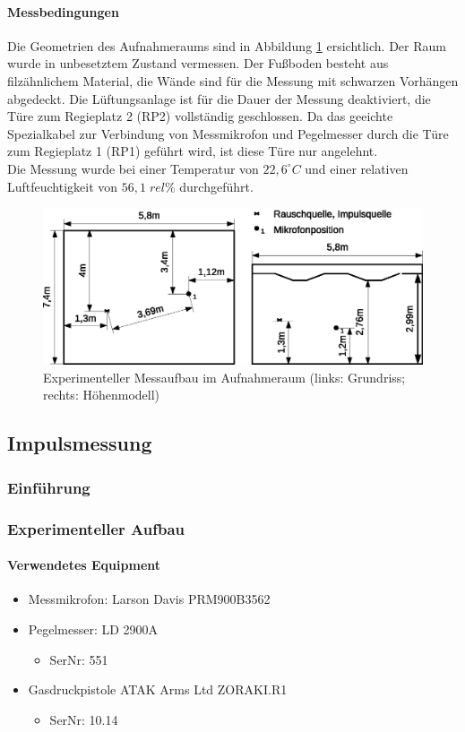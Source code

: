\documentclass[11pt]{report}
\begin{document}
\paragraph{Messbedingungen}
Die Geometrien des Aufnahmeraums sind in Abbildung \ref{fig:ARgeometrics} ersichtlich. Der Raum wurde in unbesetztem Zustand vermessen. Der Fu\ss boden besteht aus filz\"ahnlichem Material, die W\"ande sind f\"ur die Messung mit schwarzen Vorh\"angen abgedeckt. Die L\"uftungsanlage ist f\"ur die Dauer der Messung deaktiviert, die T\"ure zum Regieplatz 2 (RP2) vollst\"andig geschlossen. Da das geeichte Spezialkabel zur Verbindung von Messmikrofon und Pegelmesser durch die T\"ure zum Regieplatz 1 (RP1) gef\"uhrt wird, ist diese T\"ure nur angelehnt.\\
Die Messung wurde bei einer Temperatur von $22,6^\circ C $ und einer relativen Luftfeuchtigkeit von $56,1\;rel\%$ durchgef\"uhrt.
\begin{figure}[htbp]
\begin{center}
\includegraphics[width=14cm,keepaspectratio=true]{AR}
\caption{Experimenteller Messaufbau im Aufnahmeraum (links: Grundriss; rechts: H\"ohenmodell)}
\label{fig:ARgeometrics}
\end{center}
\end{figure}
\subsection{Impulsmessung}
\subsubsection{Einf\"uhrung}
\label{Impulseinfuehrung}
\subsubsection{Experimenteller Aufbau}
\paragraph{Verwendetes Equipment}
\begin{itemize}
\item Messmikrofon: Larson Davis PRM900B3562
\item Pegelmesser: LD 2900A
\begin{itemize}
\item SerNr: 551
\end{itemize}
\item Gasdruckpistole ATAK Arms Ltd ZORAKI.R1
\begin{itemize}
\item SerNr: 10.14
\end{itemize}
\end{itemize}
\end{document}
